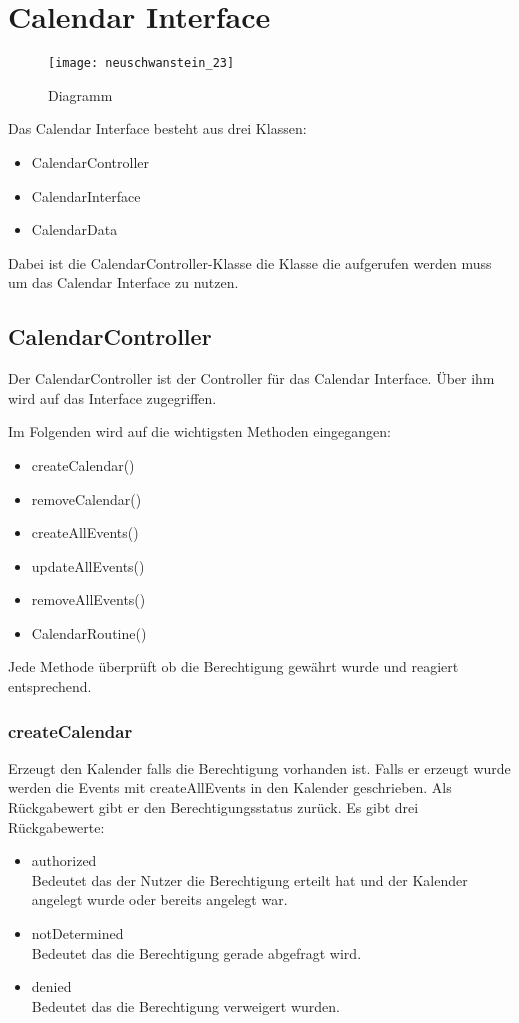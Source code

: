 \chapter{Calendar Interface}
\begin{figure}[htb]
    \centering
    \texttt{[image: neuschwanstein\_23]}
    \caption{Diagramm}
\end{figure}
Das Calendar Interface besteht aus drei Klassen:
\begin{itemize}
     \item CalendarController
     \item CalendarInterface
     \item CalendarData
\end{itemize}

Dabei ist die CalendarController-Klasse die Klasse die aufgerufen werden muss um das Calendar Interface zu nutzen.

\section{CalendarController}
Der CalendarController ist der Controller für das Calendar Interface. Über ihm wird auf das Interface zugegriffen.


Im Folgenden wird auf die wichtigsten Methoden eingegangen:
\begin{itemize}
     \item createCalendar()
     \item removeCalendar()
     \item createAllEvents()
     \item updateAllEvents()
     \item removeAllEvents()
     \item CalendarRoutine()     
\end{itemize}

Jede Methode überprüft ob die Berechtigung gewährt wurde und reagiert entsprechend.

\subsection{createCalendar}
Erzeugt den Kalender falls die Berechtigung vorhanden ist. Falls er erzeugt wurde werden die Events mit createAllEvents in den Kalender geschrieben. Als Rückgabewert gibt er den Berechtigungsstatus zurück. Es gibt drei Rückgabewerte:
\begin{itemize}
     \item authorized \\[0.5em]
     Bedeutet das der Nutzer die Berechtigung erteilt hat und der Kalender angelegt wurde oder bereits angelegt war.
     \item notDetermined \\[0.5em]
     Bedeutet das die Berechtigung gerade abgefragt wird.
     \item denied \\[0.5em]
     Bedeutet das die Berechtigung verweigert wurden.
\end{itemize}

